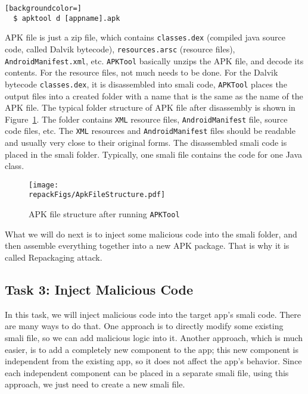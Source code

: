 \begin{lstlisting}[backgroundcolor=]
  $ apktool d [appname].apk 
\end{lstlisting}


APK file is just a zip file, which contains \texttt{classes.dex} (compiled java source code,
called Dalvik bytecode), \texttt{resources.arsc} (resource files), 
\texttt{AndroidManifest.xml}, etc. \texttt{APKTool} basically unzips the APK file, and decode its contents. 
For the resource files, not much needs to be done. 
For the Dalvik bytecode \texttt{classes.dex}, it is disassembled into smali code, 
\texttt{APKTool} places the output files
into a created folder with a name that is the same as the
name of the APK file. The typical folder structure of APK file after
disassembly is shown in Figure~\ref{fig:repackaging:apkfilestructure}.
The folder contains \texttt{XML} resource files, 
\texttt{AndroidManifest} file, source code
files, etc. The \texttt{XML} resources and 
\texttt{AndroidManifest} files should be readable and usually very
close to their original forms. The disassembled smali code is placed in the 
smali folder. Typically, one smali file contains the code for one Java class.



\begin{figure}[htb]
  \begin{center}
    \texttt{[image: \\repackFigs/ApkFileStructure.pdf]}
  \end{center}
  \caption{APK file structure after running \texttt{APKTool}}
  \label{fig:repackaging:apkfilestructure}
\end{figure}
 

What we will do next is to inject some malicious code into the smali folder,
and then assemble everything together into a new APK package. That is why it is
called Repackaging attack. 



\subsection{Task 3: Inject Malicious Code}

In this task, we will inject malicious code into the target app's smali
code. There are many ways to do that. One approach is to directly modify some existing
smali file, so we can add malicious logic into it. Another approach, which
is much easier, is to add a completely new component to the app; this
new component is independent from the existing app, so it does not
affect the app's behavior. Since each independent component can be placed
in a separate smali file, using this approach, we just need to create a
new smali file.

